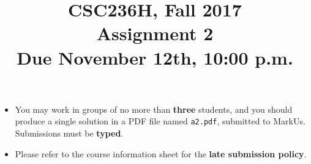 \documentclass{article}
\title{CSC236H, Fall 2017\\
Assignment 2\\
Due November 12th, 10:00 p.m.}
\begin{document}
\maketitle
\vspace{-1.5cm}
\begin{itemize}
	\item You may work in groups of no more than \textbf{three} students, and you should 
	produce a single solution in a PDF file named \texttt{a2.pdf}, submitted to {MarkUs}. Submissions must be \textbf{typed}. 
	\item Please refer to the course information sheet for the \textbf{late submission policy}.
\end{itemize}
\vspace{1\baselineskip}

\begin{enumerate}



\end{enumerate}
\end{document}
